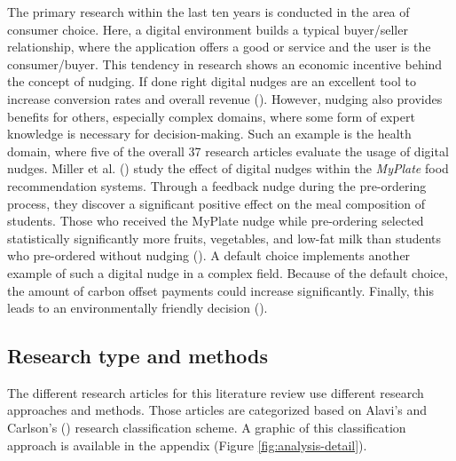 The primary research within the last ten years is conducted in the area of consumer choice. Here, a digital environment builds a typical buyer/seller relationship, where the application offers a good or service and the user is the consumer/buyer. This tendency in research shows an economic incentive behind the concept of nudging. If done right digital nudges are an excellent tool to increase conversion rates and overall revenue (\cite{mirsch_making_2018}).
However, nudging also provides benefits for others, especially complex domains, where some form of expert knowledge is necessary for decision-making. Such an example is the health domain, where five of the overall 37 research articles evaluate the usage of digital nudges. Miller et al. (\citeyear{miller_effects_2016}) study the effect of digital nudges within the \textit{MyPlate} food recommendation systems. Through a feedback nudge during the pre-ordering process, they discover a significant positive effect on the meal composition of students. Those who received the MyPlate nudge while pre-ordering selected statistically significantly more fruits, vegetables, and low-fat milk than students who pre-ordered without nudging (\cite{miller_effects_2016}).
A default choice implements another example of such a digital nudge in a complex field. Because of the default choice, the amount of carbon offset payments could increase significantly. Finally, this leads to an environmentally friendly decision (\cite{szekely_nudging_2016}).


\subsection{Research type and methods}
The different research articles for this literature review use different research approaches and methods. Those articles are categorized based on Alavi's and Carlson's (\citeyear{alavi_review_1992}) research classification scheme. A graphic of this classification approach is available in the appendix (Figure \ref{fig:analysis-detail}).

